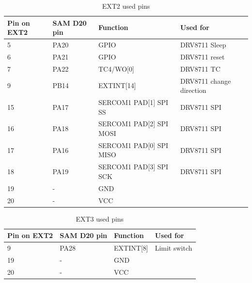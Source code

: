 \documentclass[a4paper,12pt]{scrreprt}
\begin{document}
\begin{table}[H]
\centering
\begin{tabular}{|p{2.5cm}|p{2.8cm}|p{5.8cm}|p{3.5cm}|}
\hline
Pin on EXT2 & SAM D20 pin & Function                & Used for                 \\ \hline
5           & PA20        & GPIO                    & DRV8711 Sleep            \\ \hline
6           & PA21        & GPIO                    & DRV8711 reset            \\ \hline
7           & PA22        & TC4/WO[0]               & DRV8711 \acs{TC}         \\ \hline
9           & PB14        & EXTINT[14]              & DRV8711 change direction \\ \hline
15          & PA17        & SERCOM1 PAD[1] SPI SS   & DRV8711 SPI              \\ \hline
16          & PA18        & SERCOM1 PAD[2] SPI MOSI & DRV8711 SPI              \\ \hline
17          & PA16        & SERCOM1 PAD[0] SPI MISO & DRV8711 SPI              \\ \hline
18          & PA19        & SERCOM1 PAD[3] SPI SCK  & DRV8711 SPI              \\ \hline
19          & -           & GND                     &                          \\ \hline
20          & -           & VCC                     &                         \\ \hline
\end{tabular}
\caption{EXT2 used pins}
\label{fig:EXT2 used pins}
\end{table}

\begin{table}[H]
\centering
\begin{tabular}{|p{2.5cm}|p{2.8cm}|p{5.8cm}|p{3.5cm}|}
\hline
Pin on EXT2 & SAM D20 pin & Function  & Used for     \\ \hline
9           & PA28        & EXTINT[8] & Limit switch \\ \hline
19          & -           & GND       &              \\ \hline
20          & -           & VCC       &              \\ \hline
\end{tabular}
\caption{EXT3 used pins}
\label{fig:EXT3 used pins}
\end{table}

\newpage
\end{document}
